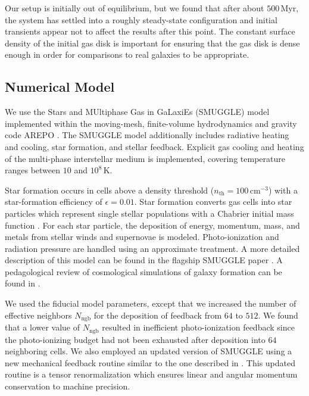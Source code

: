 \documentclass[twocolumn,linenumbers,trackchanges]{aastex631}
\newcommand{\AREPO}{\textsc{AREPO}}
\newcommand{\SMUGGLE}{SMUGGLE}
\begin{document}
Our setup is initially out of equilibrium, but we found that after about
$500\,\textrm{Myr}$, the system has settled into a roughly steady-state
configuration and initial transients appear not to affect the results after this
point. The constant surface density of the initial gas disk is important for
ensuring that the gas disk is dense enough in order for comparisons to real
galaxies to be appropriate.

\subsection{Numerical Model}
We use the Stars and MUltiphase Gas in GaLaxiEs (\SMUGGLE{}) model
\citep{2019MNRAS.489.4233M} implemented within the moving-mesh, finite-volume
hydrodynamics and gravity code \AREPO{} \citep{2010MNRAS.401..791S}. The \SMUGGLE{}
model additionally includes radiative heating and cooling, star formation, and
stellar feedback. Explicit gas cooling and heating of the multi-phase
interstellar medium is implemented, covering temperature ranges between $10$ and
$10^8\,\textrm{K}$.

Star formation occurs in cells above a density threshold
($n_{\textrm{th}}=100\,\textrm{cm}^{-3}$) with a star-formation efficiency of
$\epsilon = 0.01$. Star formation converts gas cells into star particles which
represent single stellar populations with a Chabrier initial mass function
\citep{2003PASP..115..763C}. For each star particle, the deposition of energy,
momentum, mass, and metals from stellar winds and supernovae is modeled.
Photo-ionization and radiation pressure are handled using an approximate
treatment. A more detailed description of this model can be found in the
flagship \SMUGGLE{} paper \citep{2019MNRAS.489.4233M}. A pedagological
review of cosmological simulations of galaxy formation can be found in
\citet{2020NatRP...2...42V}.

We used the fiducial model parameters, except that we increased the number of
effective neighbors $N_{\textrm{ngb}}$ for the deposition of feedback from $64$
to $512$. We found that a lower value of $N_{\textrm{ngb}}$ resulted in
inefficient photo-ionization feedback since the photo-ionizing budget had not
been exhausted after deposition into $64$ neighboring cells. We also employed an
updated version of \SMUGGLE{} using a new mechanical feedback routine similar to
the one described in \citet{2018MNRAS.480..800H}. This updated routine is a
tensor renormalization which ensures linear and angular momentum conservation to
machine precision.
\end{document}
